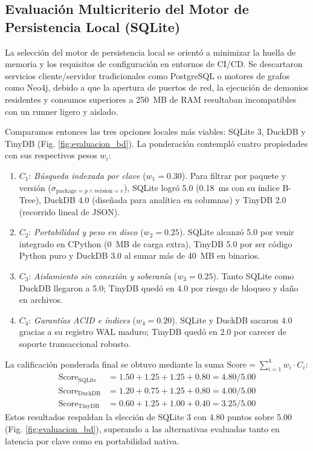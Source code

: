 \documentclass[conference]{IEEEtran}
\begin{document}
\subsection{Evaluación Multicriterio del Motor de Persistencia Local (SQLite)}
La selección del motor de persistencia local se orientó a minimizar la huella de memoria y los requisitos de configuración en entornos de CI/CD. Se descartaron servicios cliente/servidor tradicionales como PostgreSQL o motores de grafos como Neo4j, debido a que la apertura de puertos de red, la ejecución de demonios residentes y consumos superiores a 250~MB de RAM resultaban incompatibles con un runner ligero y aislado.

Comparamos entonces las tres opciones locales más viables: SQLite 3, DuckDB y TinyDB (Fig. \ref{fig:evaluacion_bd}). La ponderación contempló cuatro propiedades con sus respectivos pesos $w_i$:
\begin{enumerate}
    \item $C_1$: \textit{Búsqueda indexada por clave} ($w_1 = 0.30$). Para filtrar por paquete y versión ($\sigma_{\text{package}=p \land \text{version}=v}$), SQLite logró 5.0 (0.18~ms con su índice B-Tree), DuckDB 4.0 (diseñada para analítica en columnas) y TinyDB 2.0 (recorrido lineal de JSON).
    \item $C_2$: \textit{Portabilidad y peso en disco} ($w_2 = 0.25$). SQLite alcanzó 5.0 por venir integrado en CPython (0~MB de carga extra), TinyDB 5.0 por ser código Python puro y DuckDB 3.0 al sumar más de 40~MB en binarios.
    \item $C_3$: \textit{Aislamiento sin conexión y soberanía} ($w_3 = 0.25$). Tanto SQLite como DuckDB llegaron a 5.0; TinyDB quedó en 4.0 por riesgo de bloqueo y daño en archivos.
    \item $C_4$: \textit{Garantías ACID e índices} ($w_4 = 0.20$). SQLite y DuckDB sacaron 4.0 gracias a su registro WAL maduro; TinyDB quedó en 2.0 por carecer de soporte transaccional robusto.
\end{enumerate}

La calificación ponderada final se obtuvo mediante la suma $\text{Score} = \sum_{i=1}^4 w_i \cdot C_i$:
\begin{align*}
\text{Score}_{\text{SQLite}} &= 1.50 + 1.25 + 1.25 + 0.80 = \mathbf{4.80} / 5.00 \\
\text{Score}_{\text{DuckDB}} &= 1.20 + 0.75 + 1.25 + 0.80 = \mathbf{4.00} / 5.00 \\
\text{Score}_{\text{TinyDB}} &= 0.60 + 1.25 + 1.00 + 0.40 = \mathbf{3.25} / 5.00
\end{align*}
Estos resultados respaldan la elección de SQLite 3 con 4.80 puntos sobre 5.00 (Fig. \ref{fig:evaluacion_bd}), superando a las alternativas evaluadas tanto en latencia por clave como en portabilidad nativa.
\end{document}
